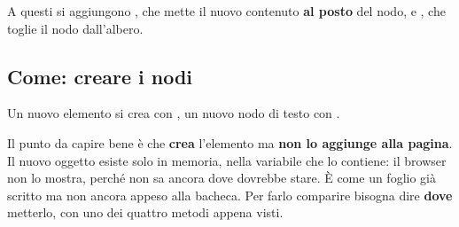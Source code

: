 A questi si aggiungono , che mette il nuovo
contenuto \textbf{al posto} del nodo, e , che toglie il nodo
dall'albero.

\subsection{Come: creare i nodi}

Un nuovo elemento si crea con , un nuovo nodo
di testo con .

Il punto da capire bene è che  \textbf{crea} l'elemento ma
\textbf{non lo aggiunge alla pagina}. Il nuovo oggetto esiste solo in memoria,
nella variabile che lo contiene: il browser non lo mostra, perché non sa ancora
dove dovrebbe stare. È come un foglio già scritto ma non ancora appeso alla
bacheca. Per farlo comparire bisogna dire \textbf{dove} metterlo, con uno dei
quattro metodi appena visti.

